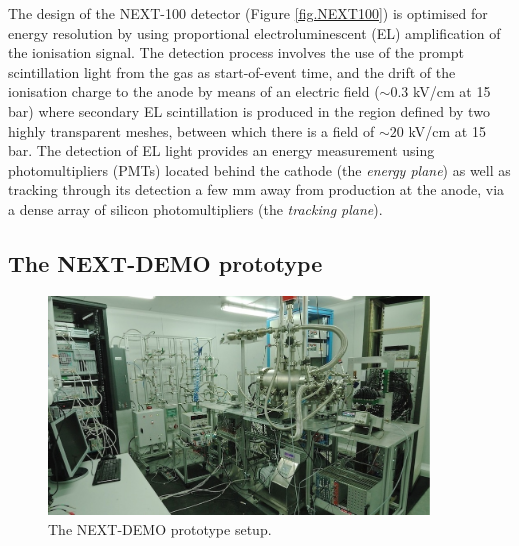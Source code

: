 The design of the NEXT-100 detector (Figure \ref{fig.NEXT100}) is optimised for energy resolution by using proportional electroluminescent (EL) amplification of the ionisation signal. The detection process involves the use of the prompt scintillation light from the gas as start-of-event time, and the drift of the ionisation charge to the anode by means of an electric field ($\sim0.3$ kV/cm at 15 bar) where secondary EL scintillation is produced in the region defined by two highly transparent meshes, between which there is a field of $\sim20$ kV/cm at 15 bar. The detection of EL light provides an energy measurement using photomultipliers (PMTs) located behind the cathode (the \emph{energy plane}) as well as tracking through its detection a few mm away from production at the anode, via a dense array of silicon photomultipliers (the \emph{tracking plane}).

\subsection*{The NEXT-DEMO prototype}

\begin{figure}
\centering
\includegraphics[width=0.9\textwidth]{img/DemoSetup.jpg}
\caption{\small The NEXT-DEMO prototype setup. 
} \label{fig.DEMO}
\end{figure}



